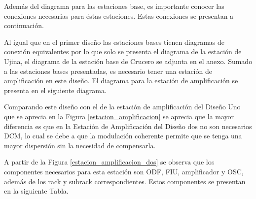 \documentclass[letterpaper,11pt]{article} %
\begin{document}
\newp
Además del diagrama para las estaciones base, es importante conocer las conexiones necesarias para éstas estaciones. Estas conexiones se presentan a continuación.

\newp
Al igual que en el primer diseño las estaciones bases tienen diagramas de conexión equivalentes por lo que solo se presenta el diagrama de la estación de Ujina, el diagrama de la estación base de Crucero se adjunta en el anexo.
\newp
Sumado a las estaciones bases presentadas, es necesario tener una estación de amplificación en este diseño. El diagrama para la estación de amplificación se presenta en el siguiente diagrama.


\newp
Comparando este diseño con el de la estación de amplificación del Diseño Uno que se aprecia en la Figura \ref{estacion_amplificacion} se aprecia que la mayor diferencia es que en la Estación de Amplificación del Diseño dos no son necesarios DCM, lo cual se debe a que la modulación coherente permite que se tenga una mayor dispersión sin la necesidad de compensarla.

\newp
A partir de la Figura \ref{estacion_amplificacion_dos} se observa que los componentes necesarios para esta estación son ODF, FIU, amplificador y OSC, además de los rack y subrack correspondientes. Estos componentes se presentan en la siguiente Tabla.
\end{document}
